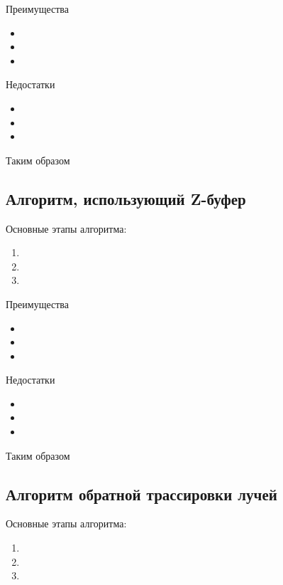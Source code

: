 Преимущества

\begin{itemize}
	\item 
	\item 
	\item
\end{itemize}

Недостатки

\begin{itemize}
	\item 
	\item 
	\item
\end{itemize}

Таким образом

\subsection{Алгоритм, использующий Z-буфер}

Основные этапы алгоритма:
\begin{enumerate}
	\item 
	\item 
	\item
\end{enumerate}

Преимущества

\begin{itemize}
	\item 
	\item 
	\item
\end{itemize}

Недостатки

\begin{itemize}
	\item 
	\item 
	\item
\end{itemize}

Таким образом

\subsection{Алгоритм обратной трассировки лучей}

Основные этапы алгоритма:
\begin{enumerate}
	\item 
	\item 
	\item
\end{enumerate}


